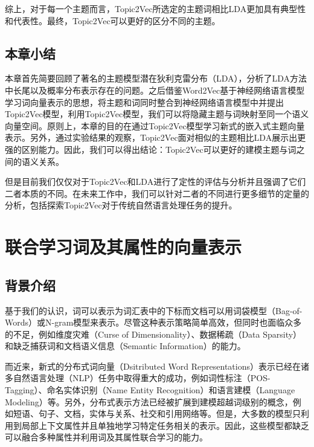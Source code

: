 \documentclass[master]{njuthesis}
\begin{document}
综上，对于每一个主题而言，Topic2Vec所选定的主题词相比LDA更加具有典型性和代表性。最终，Topic2Vec可以更好的区分不同的主题。

\section{本章小结}\label{sec_chap3_conslusions}

本章首先简要回顾了著名的主题模型潜在狄利克雷分布（LDA），分析了LDA方法中长尾以及概率分布表示存在的问题。之后借鉴Word2Vec基于神经网络语言模型学习词向量表示的思想，将主题和词同时整合到神经网络语言模型中并提出Topic2Vec模型，利用Topic2Vec模型，我们可以将隐藏主题与词映射至同一个语义向量空间。原则上，本章的目的在通过Topic2Vec模型学习新式的嵌入式主题向量表示。另外，通过实验结果的观察，Topic2Vec面对相似的主题相比LDA展示出更强的区别能力。因此，我们可以得出结论：Topic2Vec可以更好的建模主题与词之间的语义关系。

但是目前我们仅仅对于Topic2Vec和LDA进行了定性的评估与分析并且强调了它们二者本质的不同。在未来工作中，我们可以针对二者的不同进行更多细节的定量的分析，包括探索Topic2Vec对于传统自然语言处理任务的提升。

\chapter{联合学习词及其属性的向量表示}\label{chapter4_word_attributes}

\section{背景介绍}

基于我们的认识，词可以表示为词汇表中的下标而文档可以用词袋模型（Bag-of-Words）或N-gram模型来表示。尽管这种表示策略简单高效，但同时也面临众多的不足，例如维度灾难（Curse of Dimensionality）、数据稀疏（Data Sparsity）和缺乏捕获词和文档语义信息（Semantic Information）的能力。

而近来，新式的分布式词向量（Dsitributed Word Representations）表示已经在诸多自然语言处理（NLP）任务中取得重大的成功，例如词性标注（POS-Tagging）、命名实体识别（Name Entity Recognition）和语言建模（Language Modeling）等\cite{bengio2003neural,collobert2008unified,turian2010word,huang2015bidirectional}。另外，分布式表示方法已经被扩展到建模超越词级别的概念，例如短语、句子、文档\cite{le2014distributed}，实体与关系\cite{bordes2013translating,socher2013reasoning}、社交和引用网络等\cite{tang2015line}。但是，大多数的模型只利用到局部上下文属性并且单独地学习特定任务相关的表示。因此，这些模型都缺乏可以融合多种属性并利用词及其属性联合学习的能力。
\end{document}
